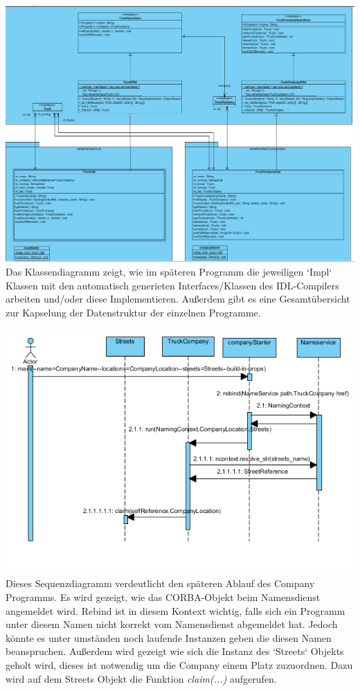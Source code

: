 \documentclass{article}
\begin{document}
\includegraphics[scale=.4]{snapshot-2}
Das Klassendiagramm zeigt, wie im späteren Programm die jeweiligen `Impl` Klassen mit den automatisch generieten Interfaces/Klassen des IDL-Compilers arbeiten und/oder diese Implementieren. Außerdem gibt es eine Gesamtübersicht zur Kapselung der Datenstruktur der einzelnen Programme.

\includegraphics[scale=.7]{snapshot2}
Dieses Sequenzdiagramm verdeutlicht den späteren Ablauf des Company Programms. Es wird gezeigt, wie das CORBA-Objekt beim Namensdienst angemeldet wird. Rebind ist in diesem Kontext wichtig, falls sich ein Programm unter diesem Namen nicht korrekt vom Namensdienst abgemeldet hat. Jedoch könnte es unter umständen noch laufende Instanzen geben die diesen Namen beanspruchen. Außerdem wird gezeigt wie sich die Instanz des `Streets` Objekts geholt wird, dieses ist notwendig um die Company einem Platz zuzuordnen. Dazu wird auf dem Streets Objekt die Funktion \textit{\tiny claim(...)} aufgerufen.\\
\end{document}
